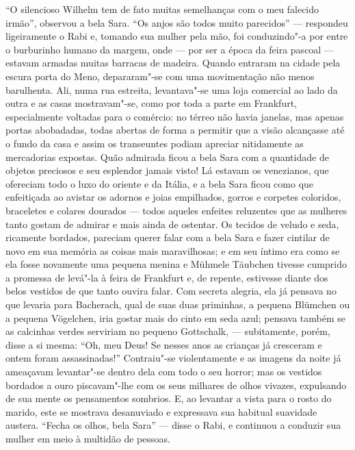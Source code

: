``O silencioso Wilhelm tem de fato muitas semelhanças com o meu falecido
irmão'', observou a bela Sara. ``Os anjos são todos muito parecidos'' ---
respondeu ligeiramente o Rabi e, tomando sua mulher pela mão, foi
conduzindo"-a por entre o burburinho humano da margem, onde --- por ser
a época da feira pascoal --- estavam armadas muitas barracas de madeira.
Quando entraram na cidade pela escura porta do Meno, depararam"-se com
uma movimentação não menos barulhenta. Ali, numa rua estreita,
levantava"-se uma loja comercial ao lado da outra e as casas
mostravam"-se, como por toda a parte em Frankfurt, especialmente
voltadas para o comércio: no térreo não havia janelas, mas apenas
portas abobadadas, todas abertas de forma a permitir que a visão
alcançasse até o fundo da casa e assim os transeuntes podiam apreciar
nitidamente as mercadorias expostas. Quão admirada ficou a bela Sara
com a quantidade de objetos preciosos e seu esplendor jamais visto! Lá
estavam os venezianos, que ofereciam todo o luxo do oriente e da
Itália, e a bela Sara ficou como que enfeitiçada ao avistar os adornos
e joias empilhados, gorros e corpetes coloridos, braceletes e colares
dourados --- todos aqueles enfeites reluzentes que as mulheres tanto
gostam de admirar e mais ainda de ostentar. Os tecidos de veludo e
seda, ricamente bordados, pareciam querer falar com a bela Sara e fazer
cintilar de novo em sua memória as coisas mais maravilhosas; e em seu
íntimo era como se ela fosse novamente uma pequena menina e Mühmele
Täubchen tivesse cumprido a promessa de levá"-la à feira de Frankfurt
e, de repente, estivesse diante dos belos vestidos de que tanto ouvira
falar. Com secreta alegria, ela já pensava no que levaria para
Bacherach, qual de suas duas priminhas, a pequena Blümchen ou a pequena
Vögelchen, iria gostar mais do cinto em seda azul; pensava também se as
calcinhas verdes serviriam no pequeno Gottschalk, --- subitamente, porém,
disse a si mesma: ``Oh, meu Deus! Se nesses anos as crianças já
cresceram e ontem foram assassinadas!'' Contraiu"-se violentamente e as
imagens da noite já ameaçavam levantar"-se dentro dela com todo o seu
horror; mas os vestidos bordados a ouro piscavam"-lhe com os seus
milhares de olhos vivazes, expulsando de sua mente os pensamentos
sombrios. E, ao levantar a vista para o rosto do marido, este se
mostrava desanuviado e expressava sua habitual suavidade austera.
``Fecha os olhos, bela Sara'' --- disse o Rabi, e continuou a conduzir sua
mulher em meio à multidão de pessoas.

